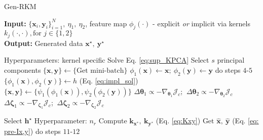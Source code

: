 \documentclass[preview,border=0.3pt]{standalone}
\begin{document}
\begin{algorithm}[]
    \caption{Gen-RKM}\label{algo}
    \small
    \textbf{Input:} $ \{\bm{x}_{i}, \bm{y}_{i}\}_{i=1}^N,~\eta_{1},~\eta_{2} $, feature map $ \phi_j ({\cdot}) $ - explicit \emph{or} implicit via kernels $ k_{j}(\cdot, \cdot), \text{for } j \in \{1, 2\} $ \\
    \textbf{Output:} Generated data $ \bm{x}^{\star},~\bm{y}^{\star}  $
    \vspace*{-10pt}
    \begin{multicols}{2}
        \begin{algorithmic}[1]
            \State Hyperparameters: kernel specific
            \State Solve Eq. \ref{eq:sup_KPCA}
            \State Select $s$ principal components
            \State $\{\bm{x}, \bm{y}\} \gets \text{\{Get mini-batch\}} $
            \State $ \phi_{1}(\bm{x})\gets \bm{x}; ~\phi_{2}(\bm{y})\gets \bm{y}  $
            \State do steps $ 4\text{-}5 $
            \State $\{\phi_{1}(\bm{x}), \phi_{2}(\bm{y})\} \gets h $ (Eq. \ref{eq:impl_sol})
            \State $ \{\bm{x}, \bm{y}\} \gets \{\psi_1(\phi_{1}(\bm{x})), \psi_2(\phi_{2}(\bm{y}))\} $
            \State $ \Delta \bm{\theta}_1 \propto -\nabla_{\bm{\theta}_1} \mathcal{J}_{c} $; $~ \Delta \bm{\theta}_2 \propto -\nabla_{\bm{\theta}_2} \mathcal{J}_{c} $
            \State $ \Delta \bm{\zeta}_1 \propto -\nabla_{\bm{\zeta}_1} \mathcal{J}_{c} $; $~ \Delta \bm{\zeta}_2 \propto -\nabla_{\bm{\zeta}_2} \mathcal{J}_{c} $
            \EndWhile
            \EndIf
            \EndProcedure
        \end{algorithmic}

        \columnbreak

        \begin{algorithmic}[1]
            \State Select $ \bm{h}^{\star}$
            \State Hyperparameter: $ n_{r} $
            \State Compute $ \bm{k}_{\bm{x}^{*}},~\bm{k}_{\bm{y}^{*}} $ (Eq. \ref{eq:Kxy})
            \State $ \text{Get }{\hat{\bm{x}}},~{\hat{\bm{y}}} $ (Eq. \ref{eq: pre-Ix,y})
            \State do steps $ 11\text{-}12$
            \EndIf

            \EndProcedure
        \end{algorithmic}
    \end{multicols}
\end{algorithm}
\end{document}
